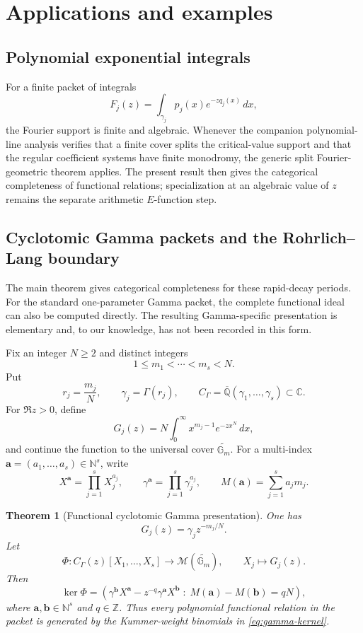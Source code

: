 \documentclass[11pt]{article}
\numberwithin{equation}{section}
\newtheorem{theorem}{Theorem}[section]
\theoremstyle{definition}
\theoremstyle{remark}
\newcommand{\Q}{\mathbb Q}
\newcommand{\C}{\mathbb C}
\newcommand{\Gm}{\mathbb G_m}
\begin{document}
\section{Applications and examples}\label{sec:examples}

\subsection{Polynomial exponential integrals}

For a finite packet of integrals
\[
  F_j(z)=\int_{\gamma_j}p_j(x)e^{-zq_j(x)}\,dx,
\]
the Fourier support is finite and algebraic.  Whenever the companion
polynomial-line analysis verifies that a finite cover splits the critical-value
support and that the regular coefficient systems have finite monodromy, the
generic split Fourier-geometric theorem applies.  The present result then gives
the categorical completeness of functional relations; specialization at an
algebraic value of $z$ remains the separate arithmetic $E$-function step.

\subsection{Cyclotomic Gamma packets and the Rohrlich--Lang boundary}
\label{subsec:gamma-presentation}

The main theorem gives categorical completeness for these rapid-decay periods.
For the standard one-parameter Gamma packet, the complete functional ideal can
also be computed directly.  The resulting Gamma-specific presentation is elementary and, to our knowledge,
has not been recorded in this form.

Fix an integer $N\geq2$ and distinct integers
\[
  1\leq m_1<\cdots<m_s<N.
\]
Put
\[
  r_j=\frac{m_j}{N},
  \qquad
  \gamma_j=\Gamma(r_j),
  \qquad
  C_\Gamma=\overline{\Q}(\gamma_1,\ldots,\gamma_s)\subset\C.
\]
For $\Re z>0$, define
\[
  G_j(z)
  =N\int_0^\infty x^{m_j-1}e^{-zx^N}\,dx,
\]
and continue the function to the universal cover $\widetilde{\Gm}$.
For a multi-index $\mathbf a=(a_1,\ldots,a_s)\in\mathbb N^s$, write
\[
  X^{\mathbf a}=\prod_{j=1}^sX_j^{a_j},
  \qquad
  \gamma^{\mathbf a}=\prod_{j=1}^s\gamma_j^{a_j},
  \qquad
  M(\mathbf a)=\sum_{j=1}^sa_jm_j.
\]

\begin{theorem}[Functional cyclotomic Gamma presentation]
\label{thm:functional-gamma-presentation}
One has
\[
  G_j(z)=\gamma_jz^{-m_j/N}.
\]
Let
\[
  \Phi:C_\Gamma(z)[X_1,\ldots,X_s]
  \longrightarrow \mathscr M(\widetilde{\Gm}),
  \qquad
  X_j\longmapsto G_j(z).
\]
Then
\begin{equation}\label{eq:gamma-kernel}
  \ker\Phi
  =\left(
      \gamma^{\mathbf b}X^{\mathbf a}
      -z^{-q}\gamma^{\mathbf a}X^{\mathbf b}
      \;:\;
      M(\mathbf a)-M(\mathbf b)=qN
    \right),
\end{equation}
where $\mathbf a,\mathbf b\in\mathbb N^s$ and $q\in\mathbb Z$.
Thus every polynomial functional relation in the packet is generated by the
Kummer-weight binomials in \eqref{eq:gamma-kernel}.
\end{theorem}
\end{document}
